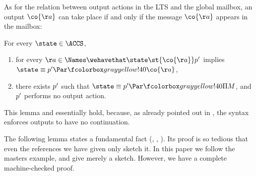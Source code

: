 As for the relation between output actions in the LTS and the global
mailbox, an output $\co{\aa}$ can take place if and only if %
the message $\co{\aa}$ appears in the mailbox:
\begin{lemma}
  \label{lem:output-shape}
  For every $\state \in \ACCS$,
  \begin{enumerate}
    \item%
      for every $\aa \in \Names \wehavethat \state \st{
        \co{\aa} } \stateA$ implies %
      $\state \equiv  \stateA \Par
      \mailbox{\co{\aa}}$,
    \item%
      there exists $ p' $ such that
      $\state \equiv  \stateA \Par \mailbox{ \Pi M }$,
      and  $p'$ performs no output action.%
  \end{enumerate}
\end{lemma}
\noindent
This lemma and  essentially hold, because, as already pointed out in , the syntax enforces outputs to have no continuation.





The following lemma states a fundamental fact
(\cite[Lemma 2.13%
]{DBLP:books/daglib/0018113},
\cite[Proposition 5.2%
]{DBLP:books/daglib/0098267},
\cite[Lemma 1.4.15]{DBLP:books/daglib/0004377}).
Its proof is so tedious that even the references we have given only
sketch it. In this paper we follow the masters example, and give
merely a sketch. However, we have a complete machine-checked proof.

